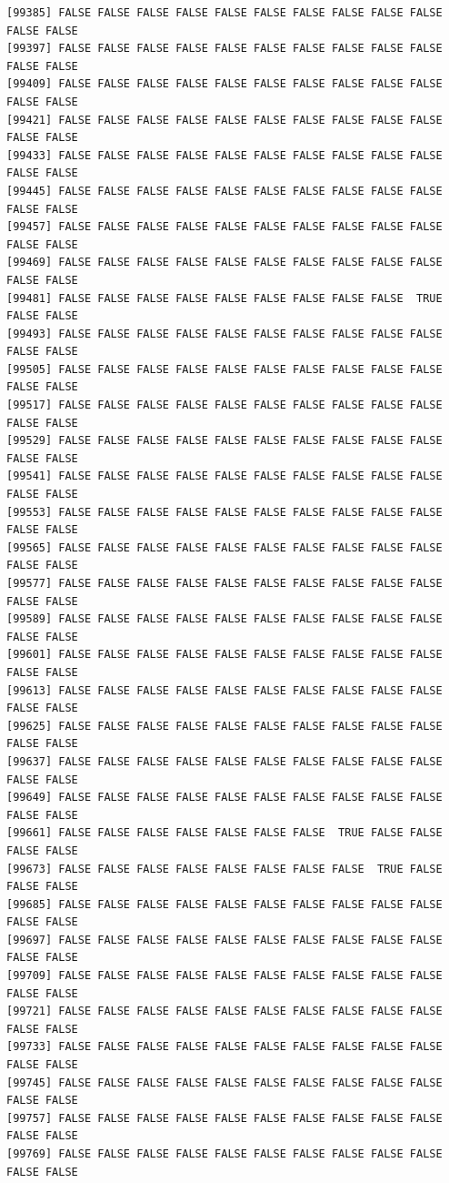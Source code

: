 \documentclass[
  a4paper,
  DIV=11,
  numbers=noendperiod]{scrartcl}
\begin{document}
\begin{verbatim}
[99385] FALSE FALSE FALSE FALSE FALSE FALSE FALSE FALSE FALSE FALSE FALSE FALSE
[99397] FALSE FALSE FALSE FALSE FALSE FALSE FALSE FALSE FALSE FALSE FALSE FALSE
[99409] FALSE FALSE FALSE FALSE FALSE FALSE FALSE FALSE FALSE FALSE FALSE FALSE
[99421] FALSE FALSE FALSE FALSE FALSE FALSE FALSE FALSE FALSE FALSE FALSE FALSE
[99433] FALSE FALSE FALSE FALSE FALSE FALSE FALSE FALSE FALSE FALSE FALSE FALSE
[99445] FALSE FALSE FALSE FALSE FALSE FALSE FALSE FALSE FALSE FALSE FALSE FALSE
[99457] FALSE FALSE FALSE FALSE FALSE FALSE FALSE FALSE FALSE FALSE FALSE FALSE
[99469] FALSE FALSE FALSE FALSE FALSE FALSE FALSE FALSE FALSE FALSE FALSE FALSE
[99481] FALSE FALSE FALSE FALSE FALSE FALSE FALSE FALSE FALSE  TRUE FALSE FALSE
[99493] FALSE FALSE FALSE FALSE FALSE FALSE FALSE FALSE FALSE FALSE FALSE FALSE
[99505] FALSE FALSE FALSE FALSE FALSE FALSE FALSE FALSE FALSE FALSE FALSE FALSE
[99517] FALSE FALSE FALSE FALSE FALSE FALSE FALSE FALSE FALSE FALSE FALSE FALSE
[99529] FALSE FALSE FALSE FALSE FALSE FALSE FALSE FALSE FALSE FALSE FALSE FALSE
[99541] FALSE FALSE FALSE FALSE FALSE FALSE FALSE FALSE FALSE FALSE FALSE FALSE
[99553] FALSE FALSE FALSE FALSE FALSE FALSE FALSE FALSE FALSE FALSE FALSE FALSE
[99565] FALSE FALSE FALSE FALSE FALSE FALSE FALSE FALSE FALSE FALSE FALSE FALSE
[99577] FALSE FALSE FALSE FALSE FALSE FALSE FALSE FALSE FALSE FALSE FALSE FALSE
[99589] FALSE FALSE FALSE FALSE FALSE FALSE FALSE FALSE FALSE FALSE FALSE FALSE
[99601] FALSE FALSE FALSE FALSE FALSE FALSE FALSE FALSE FALSE FALSE FALSE FALSE
[99613] FALSE FALSE FALSE FALSE FALSE FALSE FALSE FALSE FALSE FALSE FALSE FALSE
[99625] FALSE FALSE FALSE FALSE FALSE FALSE FALSE FALSE FALSE FALSE FALSE FALSE
[99637] FALSE FALSE FALSE FALSE FALSE FALSE FALSE FALSE FALSE FALSE FALSE FALSE
[99649] FALSE FALSE FALSE FALSE FALSE FALSE FALSE FALSE FALSE FALSE FALSE FALSE
[99661] FALSE FALSE FALSE FALSE FALSE FALSE FALSE  TRUE FALSE FALSE FALSE FALSE
[99673] FALSE FALSE FALSE FALSE FALSE FALSE FALSE FALSE  TRUE FALSE FALSE FALSE
[99685] FALSE FALSE FALSE FALSE FALSE FALSE FALSE FALSE FALSE FALSE FALSE FALSE
[99697] FALSE FALSE FALSE FALSE FALSE FALSE FALSE FALSE FALSE FALSE FALSE FALSE
[99709] FALSE FALSE FALSE FALSE FALSE FALSE FALSE FALSE FALSE FALSE FALSE FALSE
[99721] FALSE FALSE FALSE FALSE FALSE FALSE FALSE FALSE FALSE FALSE FALSE FALSE
[99733] FALSE FALSE FALSE FALSE FALSE FALSE FALSE FALSE FALSE FALSE FALSE FALSE
[99745] FALSE FALSE FALSE FALSE FALSE FALSE FALSE FALSE FALSE FALSE FALSE FALSE
[99757] FALSE FALSE FALSE FALSE FALSE FALSE FALSE FALSE FALSE FALSE FALSE FALSE
[99769] FALSE FALSE FALSE FALSE FALSE FALSE FALSE FALSE FALSE FALSE FALSE FALSE

\end{verbatim}
\end{document}
